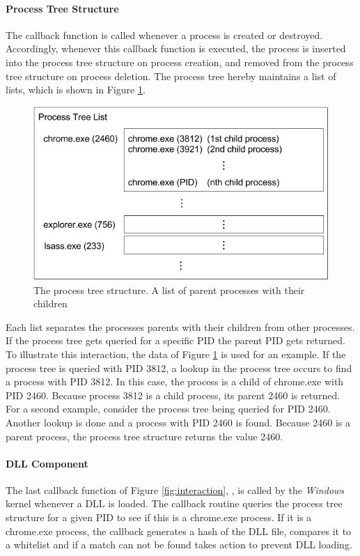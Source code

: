 \paragraph{Process Tree Structure}
The  callback function is called whenever a process is created or destroyed. Accordingly, whenever this callback function is executed, the process is inserted into the process tree structure on process creation, and removed from the process tree structure on process deletion. The process tree hereby maintains a list of lists, which is shown in Figure \ref{fig:listoflists}.
\begin{figure}[!htbp]
\centering
\includegraphics[scale=0.6]{sections/implementation/listoflists.png}
\caption{The process tree structure. A list of parent processes with their children}
\label{fig:listoflists}
\end{figure}
Each list separates the processes parents with their children from other processes. If the process tree gets queried for a specific \gls{PID} the parent \gls{PID} gets returned. To illustrate this interaction, the data of Figure \ref{fig:listoflists} is used for an example. If the process tree is queried with \gls{PID} 3812, a lookup in the process tree occurs to find a process with \gls{PID} 3812. In this case, the process is a child of chrome.exe with \gls{PID} 2460.
Because process 3812 is a child process, its parent 2460 is returned. For a second example, consider the process tree being queried for \gls{PID} 2460. Another lookup is done and a process with \gls{PID} 2460 is found. Because 2460 is a parent process, the process tree structure returns the value 2460.

\paragraph{DLL Component}
The last callback function of Figure \ref{fig:interaction}, , is called by the \emph{Windows} kernel whenever a DLL is loaded. The callback routine queries the process tree structure for a given \gls{PID} to see if this is a chrome.exe process. If it is a chrome.exe process, the callback generates a hash of the DLL file, compares it to a whitelist and if a match can not be found takes action to prevent DLL loading.

